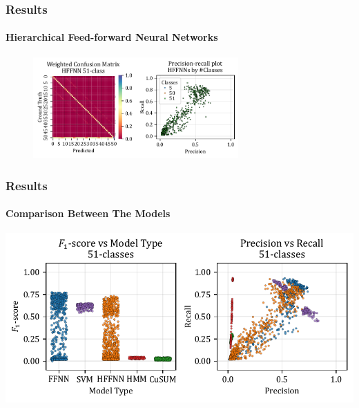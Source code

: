 \documentclass[xcolor={svgnames,table},10pt,fleqn]{beamer}
\begin{document}
\begin{frame}
    \frametitle{Results}
    \framesubtitle{Hierarchical Feed-forward Neural Networks}
    \begin{figure}[h]
        \centering
        \includegraphics[width=0.7\textwidth]{imgs/05_mean_conf_mat_hffnn.pdf}
    \end{figure}
\end{frame}

\begin{frame}
    \frametitle{Results}
    \framesubtitle{Comparison Between The Models}
    \includegraphics[width=\textwidth]{imgs/05_precision_recall_51_classes.pdf}
\end{frame}
\end{document}
